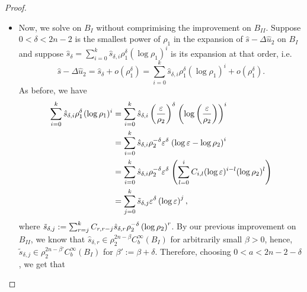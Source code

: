 \documentclass[a4paper,11pt]{article}
\begin{document}
\begin{proof}
\begin{itemize}
$$$$
Therefore, $\hat u_\delta$ is a formal solution for (\ref{linpot2}) at order $\delta$ near $B_{II}$. Replacing $\hat s$ by $\hat s - \Delta \hat u_\delta$ and noticing that 
$$
\int (\hat s - \Delta \hat u_\delta) \omega^n = \int \hat s \omega^n - \int \Delta \hat u_\delta \omega^n = 0 - 0 = 0,
$$
we can iterate the argument to remove all terms in the expansion near $B_{II}$ of order $0<\delta < 2n$. Therefore, putting $\hat u_2 = \sum_{0 < \delta < 2n} \hat u_\delta$, we can suppose that 
$$
\hat s - \Delta \hat u_2 \in \rho_2^{2n - \beta} C_b^\infty(\mathcal{X}_b) \hspace{0.1cm}\text{for some}\;\beta>0\;\text{arbitrarily small}.
$$
        \item Now, we solve on $B_{I}$ without comprimising the improvement on $B_{II}$. Suppose $0< \delta< 2n -2 $ is the smallest power of $\rho_1$ in the expansion of $\hat s - \Delta \hat u_2$ on $B_{I}$ and suppose $\hat s_\delta =\sum_{i=0}^k \hat s_{\delta,i} \rho_1^{\delta} (\log \rho_1)^i$ is its expansion at that order, i.e.
$$
\hat s - \Delta \hat u_2 = \hat s_\delta + o(\rho_1^\delta) = \sum_{i=0}^k \hat s_{\delta,i} \rho_1^{\delta} (\log \rho_1)^i + o(\rho_1^\delta).
$$
As before, we have 
\begin{align*}
        \sum_{i=0}^k \hat s_{\delta, i} \rho_1^{\delta}\hspace{0.03cm}(\log \rho_1)^i & = \sum_{i=0}^k \hat s_{\delta, i} \left(\frac{\varepsilon}{\rho_2}\right)^{\delta}\hspace{0.03cm} \left(\log \left(\frac{\varepsilon}{\rho_2}\right) \right)^i \\ & = \sum_{i=0}^k \hat  s_{\delta, i} \rho_2^{- \delta} \varepsilon^{\delta}\hspace{0.03cm} \left(\log \varepsilon  - \log \rho_2 \right)^i \\ & =\sum_{i=0}^k \hat s_{\delta, i} \rho_2^{- \delta} \varepsilon^{\delta}\hspace{0.03cm}  \left( \sum_{l=0}^i C_{i,l} (\log \varepsilon)^{i-l} (\log \rho_2)^{l} \right) \\ & = \sum_{j=0}^{k} \tilde s_{\delta, j} \varepsilon^{\delta}  \left(\log \varepsilon \right)^j,
         \end{align*}
where $\tilde s_{\delta, j}  : = \sum_{r=j}^{k} C_{r,r-j} \hat s_{\delta, r} \hspace{0.02cm}\rho_2^{- \delta} \left( \log \rho_2 \right)^r$. By our previous improvement on $B_{II}$, we know that $\hat s_{\delta,r} \in \rho_2^{2n - \beta} C_b^\infty ( B_{I})$ for arbitrarily small $\beta >0$, hence, $\tilde s_{\delta,j} \in \rho_2^{2n - \beta'} C_b^\infty (B_{I})$ for $ \beta' := \beta + \delta$. Therefore, choosing $0 < a < 2n -2 - \delta$, we get that 

\end{itemize}
\end{proof}
\end{document}
